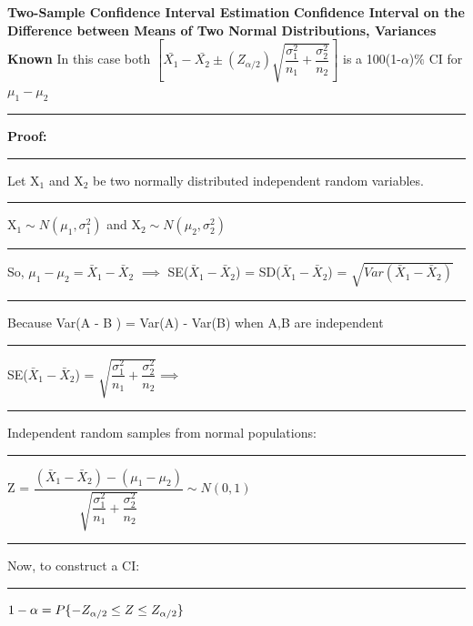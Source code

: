 \documentclass[]{article}
\begin{document}
\newline 
\newline 
\Large\textbf{Two-Sample Confidence Interval Estimation}
\newline
\Large\textbf{Confidence Interval on the Difference between Means of Two Normal Distributions, Variances Known}
\newline In this case both 
\newline
\newline
$\left[ \bar{X_{1}} - \bar{X_{2}} \pm \left( Z_{\alpha / 2}  \right) \sqrt{\dfrac{\sigma^2_1}{n_1} + \dfrac{\sigma^2_2}{n_2}    }      \right] $ is a 100(1-$\alpha$)$\%$ CI for $\mu_1 - \mu_2$ 
\newline 
\newline
\newline\Large\rule{3.0cm}{0pt} \textbf{Proof:}
\newline\Large\rule{3.0cm}{0pt} Let X$_1$ and X$_2$ be two normally distributed independent random variables.
\newline\Large\rule{3.0cm}{0pt} X$_1 \sim N( \mu_1, \sigma^2_1 )$  and X$_2 \sim N( \mu_2, \sigma^2_2 )$ 
\newline\Large\rule{3.0cm}{0pt} So, $\mu_1 - \mu_2 = \bar{X}_1 - \bar{X}_2$ $\implies$ SE($\bar{X}_1 - \bar{X}_2$) = SD($\bar{X}_1 - \bar{X}_2$) = $\sqrt{Var(\bar{X}_1 - \bar{X}_2 )}$
\newline\newline\Large\rule{3.0cm}{0pt} Because Var(A - B ) = Var(A) - Var(B) when A,B are independent
\newline\newline\Large\rule{3.0cm}{0pt} SE($\bar{X}_1 - \bar{X}_2$) = $\sqrt{\dfrac{\sigma^2_1}{n_1} + \dfrac{\sigma^2_2}{n_2} } \implies$    
\newline\newline\Large\rule{3.0cm}{0pt} Independent random samples from normal populations:
\newline\newline\Large\rule{3.0cm}{0pt} Z = $\dfrac{  (  \bar{X}_1 - \bar{X}_2 )  -  (\mu_1 - \mu_2)   }{\sqrt{\dfrac{\sigma^2_1}{n_1} + \dfrac{\sigma^2_2}{n_2} }} \sim N(0,1)$
\newline\newline\Large\rule{3.0cm}{0pt}  Now, to construct a CI:
\newline
\newline\Large\rule{3.0cm}{0pt} $1 - \alpha = P \{ -Z_{\alpha\\/2} \le Z \le Z_{\alpha\\/2}  \}$
\end{document}
